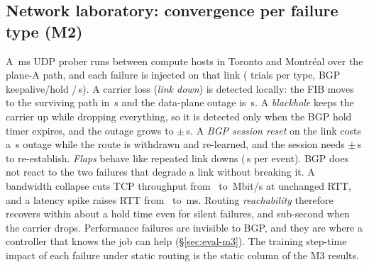 \subsection{Network laboratory: convergence per failure type (M2)}
\label{sec:eval-m2}
A \,ms UDP prober runs between compute hosts in Toronto and Montr\'eal over the plane-A path, and
each failure is injected on that link (\CmTwoTrials{} trials per type, BGP keepalive/hold /\,s).
A carrier loss (\emph{link down}) is detected locally: the FIB moves to the surviving path in
\CmTwoLinkDownFib\,s and the data-plane outage is \CmTwoLinkDownOutage\,s. A \emph{blackhole} keeps the carrier
up while dropping everything, so it is detected only when the BGP hold timer expires, and the outage grows
to \CmTwoBlackholeOutage{}$\pm$\CmTwoBlackholeOutageCi\,s. A \emph{BGP session reset} on the link costs a
\CmTwoBgpResetOutage\,s outage while the route is withdrawn and re-learned, and the session needs
\CmTwoBgpResetBgpReest{}$\pm$\CmTwoBgpResetBgpReestCi\,s to re-establish. \emph{Flaps} behave like repeated link
downs (\CmTwoFlapOutage\,s per event). BGP does not react to the two failures that degrade a link without
breaking it. A bandwidth collapse cuts TCP throughput from \CmTwoBwCollapseTputBefore\ to
\CmTwoBwCollapseTputDuring\,Mbit/s at unchanged RTT, and a latency spike raises RTT from
\CmTwoLatSpikeRttBefore\ to \CmTwoLatSpikeRttDuring\,ms. Routing \emph{reachability} therefore recovers within
about a hold time even for silent failures, and sub-second when the carrier drops. Performance failures are invisible to BGP, and they are where a
controller that knows the job can help (\S\ref{sec:eval-m3}). The training step-time impact of each
failure under static routing is the \textsf{static} column of the M3 results.

